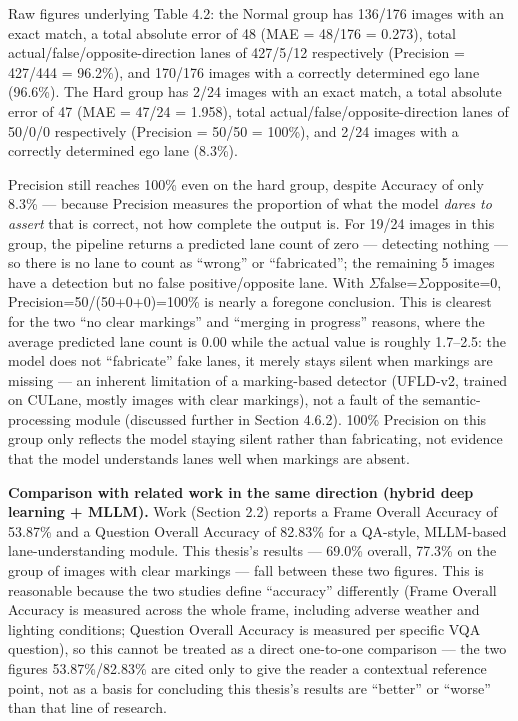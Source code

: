 \documentclass[12pt,a4paper]{report}
\begin{document}
Raw figures underlying Table 4.2: the Normal group has 136/176 images with an exact match, a total absolute error of 48 (MAE = 48/176 = 0.273), total actual/false/opposite-direction lanes of 427/5/12 respectively (Precision = 427/444 = 96.2\%), and 170/176 images with a correctly determined ego lane (96.6\%). The Hard group has 2/24 images with an exact match, a total absolute error of 47 (MAE = 47/24 = 1.958), total actual/false/opposite-direction lanes of 50/0/0 respectively (Precision = 50/50 = 100\%), and 2/24 images with a correctly determined ego lane (8.3\%).

Precision still reaches 100\% even on the hard group, despite Accuracy of only 8.3\% --- because Precision measures the proportion of what the model \textit{dares to assert} that is correct, not how complete the output is. For 19/24 images in this group, the pipeline returns a predicted lane count of zero --- detecting nothing --- so there is no lane to count as ``wrong'' or ``fabricated''; the remaining 5 images have a detection but no false positive/opposite lane. With $\Sigma$false=$\Sigma$opposite=0, Precision=50/(50+0+0)=100\% is nearly a foregone conclusion. This is clearest for the two ``no clear markings'' and ``merging in progress'' reasons, where the average predicted lane count is 0.00 while the actual value is roughly 1.7--2.5: the model does not ``fabricate'' fake lanes, it merely stays silent when markings are missing --- an inherent limitation of a marking-based detector (UFLD-v2, trained on CULane, mostly images with clear markings), not a fault of the semantic-processing module (discussed further in Section 4.6.2). 100\% Precision on this group only reflects the model staying silent rather than fabricating, not evidence that the model understands lanes well when markings are absent.

\textbf{Comparison with related work in the same direction (hybrid deep learning + MLLM).} Work \cite{sah2025advancing} (Section 2.2) reports a Frame Overall Accuracy of 53.87\% and a Question Overall Accuracy of 82.83\% for a QA-style, MLLM-based lane-understanding module. This thesis's results --- 69.0\% overall, 77.3\% on the group of images with clear markings --- fall between these two figures. This is reasonable because the two studies define ``accuracy'' differently (Frame Overall Accuracy is measured across the whole frame, including adverse weather and lighting conditions; Question Overall Accuracy is measured per specific VQA question), so this cannot be treated as a direct one-to-one comparison --- the two figures 53.87\%/82.83\% are cited only to give the reader a contextual reference point, not as a basis for concluding this thesis's results are ``better'' or ``worse'' than that line of research.
\end{document}
